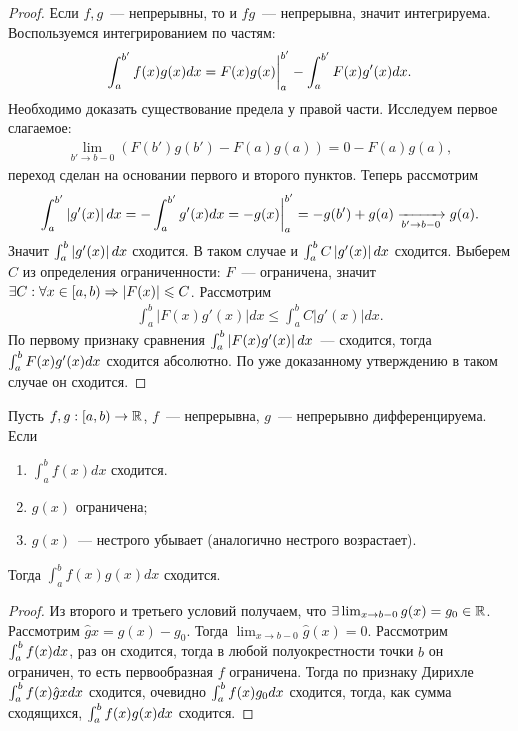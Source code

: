 \documentclass[../main.tex]{subfiles}
\begin{document}
  
  \begin{proof}
    Если $f,g$~--- непрерывны, то и $fg$~--- непрерывна, значит интегрируема. Воспользуемся интегрированием по частям: 
    \begin{gather} 
      \int_{a}^{b'} f(x) g(x) dx = F(x) g(x) \bigg|_{a}^{b'} - \int_{a}^{b'} F(x) g'(x) dx .
    \end{gather}
    Необходимо доказать существование предела у правой части. Исследуем первое слагаемое:
    \begin{gather} 
      \lim_{b' \to b-0} \left(F(b') g(b') - F(a)g(a)\right) = 0-F(a)g(a) ,
    \end{gather}
    переход сделан на основании первого и второго пунктов. Теперь рассмотрим 
    \begin{gather} 
      \int_{a}^{b'} \left| g'(x) \right| dx = - \int_{a}^{b'} g'(x) dx = -g(x) \bigg|_{a}^{b'} = -g(b') + g(a)  \xrightarrow[b' \to  b-0 ]{} g(a) .
    \end{gather}
    Значит $\int_a^b \left| g'(x)  \right| dx$ сходится. В таком случае и $\int_a^b C \left| g'(x)  \right| dx$ сходится. Выберем $C$ из определения ограниченности: $F$~--- ограничена, значит $\exists C: \forall x \in[a,b) \Rightarrow \left| F(x) \right| \leqslant C$. Рассмотрим 
    \begin{gather} 
      \int_{a}^{b} \left| F(x) g'(x) \right| dx \leq \int_{a}^{b}  C \left| g'(x) \right| dx.
    \end{gather}
    По первому признаку сравнения $\int_a^b \left| F(x) g'(x) \right| dx$~--- сходится, тогда $\int_a^b F(x) g'(x) dx$ сходится абсолютно. По уже доказанному утверждению в таком случае он сходится.
  \end{proof}

  \begin{theorem}
    Пусть $f,g: [a,b) \to \mathbb{R}$, $f$~--- непрерывна, $g$~--- непрерывно дифференцируема. Если
    \begin{enumerate}
      \item $\int_{a}^{b} f(x) dx$ сходится.
      \item $g(x)$ ограничена;
      \item $ g(x) $~--- нестрого убывает (аналогично нестрого возрастает). 
    \end{enumerate}  
    Тогда $\int_{a}^{b} f(x) g(x) dx$ сходится. 
  \end{theorem}

  
  \begin{proof}
    Из второго и третьего условий получаем, что $\exists \lim_{x \to b-0} g(x) = g_0 \in \mathbb{R}$. Рассмотрим $\hat{g}x = g(x) - g_0 $. Тогда $\lim_{x \to b-0}  \hat{g}(x) =0$. Рассмотрим $\int_a^b f(x) dx$, раз он сходится, тогда в любой полуокрестности точки $b$ он ограничен, то есть первообразная $f$ ограничена. Тогда по признаку Дирихле $\int_a^b f(x) \hat{g}x dx$ сходится, очевидно $\int_a^b f(x) g_0 dx$ сходится, тогда, как сумма сходящихся, $\int_a^b f(x)  g(x)  dx$  сходится.
  \end{proof}
  
\end{document}
